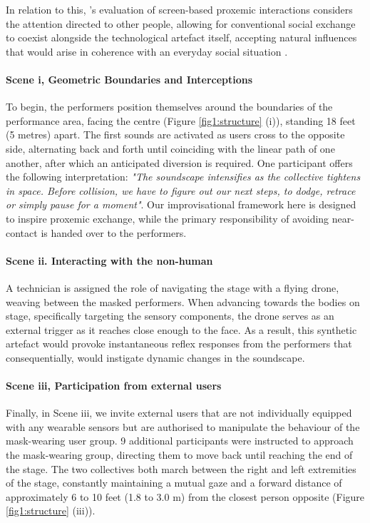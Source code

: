 In relation to this, \citeauthor{ballendat_proxemic_2010}'s evaluation of screen-based proxemic interactions considers the attention directed to other people, allowing for conventional social exchange to coexist alongside the technological artefact itself, accepting natural influences that would arise in coherence with an everyday social situation \cite{ballendat_proxemic_2010}.

\paragraph{Scene i, Geometric Boundaries and Interceptions}

To begin, the performers position themselves around the boundaries of the performance area, facing the centre (Figure \ref{fig1:structure} (i)), standing 18 feet (5 metres) apart. The first sounds are activated as users cross to the opposite side, alternating back and forth until coinciding with the linear path of one another, after which an anticipated diversion is required. One participant offers the following interpretation: \textit{"The soundscape intensifies as the collective tightens in space. Before collision, we have to figure out our next steps, to dodge, retrace or simply pause for a moment"}. Our improvisational framework here is designed to inspire proxemic exchange, while the primary responsibility of avoiding near-contact is handed over to the performers.

\paragraph{Scene ii. Interacting with the non-human}

A technician is assigned the role of navigating the stage with a flying drone, weaving between the masked performers. When advancing towards the bodies on stage, specifically targeting the sensory components, the drone serves as an external trigger as it reaches close enough to the face. As a result, this synthetic artefact would provoke instantaneous reflex responses from the performers that consequentially, would instigate dynamic changes in the soundscape.

\paragraph{Scene iii, Participation from external users}

Finally, in Scene iii, we invite external users that are not individually equipped with any wearable sensors but are authorised to manipulate the behaviour of the mask-wearing user group. 9 additional participants were instructed to approach the mask-wearing group, directing them to move back until reaching the end of the stage. The two collectives both march between the right and left extremities of the stage, constantly maintaining a mutual gaze and a forward distance of approximately 6 to 10 feet (1.8 to 3.0 m) from the closest person opposite (Figure \ref{fig1:structure} (iii)).

